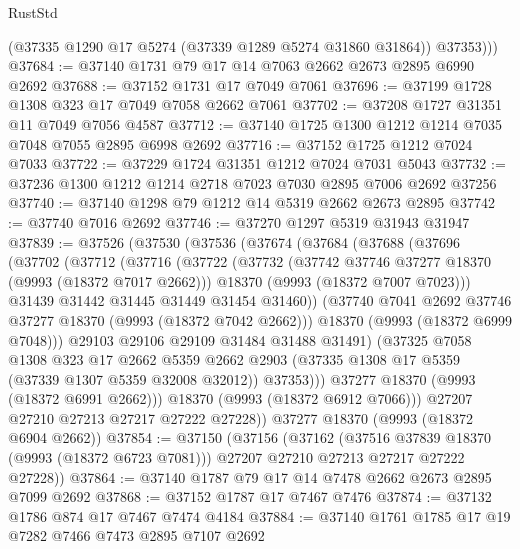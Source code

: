 \begin{lexlean}{RustStd}
\begin{coremodule}
          (@37335 @1290 @17 @5274 (@37339 @1289 @5274 @31860 @31864))
          @37353)))
@37684 := @37140 @1731 @79 @17 @14 @7063 @2662 @2673 @2895 @6990 @2692
@37688 := @37152 @1731 @17 @7049 @7061
@37696 := @37199 @1728 @1308 @323 @17 @7049 @7058 @2662 @7061
@37702 := @37208 @1727 @31351 @11 @7049 @7056 @4587
@37712 := @37140 @1725 @1300 @1212 @1214 @7035 @7048 @7055 @2895 @6998 @2692
@37716 := @37152 @1725 @1212 @7024 @7033
@37722 := @37229 @1724 @31351 @1212 @7024 @7031 @5043
@37732 := @37236 @1300 @1212 @1214 @2718 @7023 @7030 @2895 @7006 @2692 @37256
@37740 := @37140 @1298 @79 @1212 @14 @5319 @2662 @2673 @2895
@37742 := @37740 @7016 @2692
@37746 := @37270 @1297 @5319 @31943 @31947
@37839 := @37526
    (@37530
      (@37536
        (@37674
          (@37684
            (@37688
              (@37696
                (@37702
                  (@37712
                    (@37716
                      (@37722
                        (@37732
                          (@37742 @37746 @37277 @18370 (@9993 (@18372 @7017 @2662)))
                          @18370
                          (@9993 (@18372 @7007 @7023)))
                        @31439
                        @31442
                        @31445
                        @31449
                        @31454
                        @31460))
                    (@37740 @7041 @2692 @37746 @37277 @18370 (@9993 (@18372 @7042 @2662)))
                    @18370
                    (@9993 (@18372 @6999 @7048)))
                  @29103
                  @29106
                  @29109
                  @31484
                  @31488
                  @31491)
                (@37325
                  @7058
                  @1308
                  @323
                  @17
                  @2662
                  @5359
                  @2662
                  @2903
                  (@37335 @1308 @17 @5359 (@37339 @1307 @5359 @32008 @32012))
                  @37353)))
            @37277
            @18370
            (@9993 (@18372 @6991 @2662)))
          @18370
          (@9993 (@18372 @6912 @7066)))
        @27207
        @27210
        @27213
        @27217
        @27222
        @27228))
    @37277
    @18370
    (@9993 (@18372 @6904 @2662))
@37854 := @37150
    (@37156
      (@37162
        (@37516 @37839 @18370 (@9993 (@18372 @6723 @7081)))
        @27207
        @27210
        @27213
        @27217
        @27222
        @27228))
@37864 := @37140 @1787 @79 @17 @14 @7478 @2662 @2673 @2895 @7099 @2692
@37868 := @37152 @1787 @17 @7467 @7476
@37874 := @37132 @1786 @874 @17 @7467 @7474 @4184
@37884 := @37140 @1761 @1785 @17 @19 @7282 @7466 @7473 @2895 @7107 @2692

\end{coremodule}
\end{lexlean}
